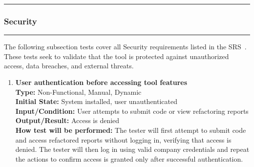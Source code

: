\documentclass[12pt, titlepage]{article}
\newcommand{\colorrule}{\textcolor{BlueViolet}{\rule{\linewidth}{2pt}}}
\begin{document}
\newpage

\noindent
\colorrule

\subsubsection{Security}
\colorrule

\medskip

\noindent
The following subsection tests cover all Security requirements listed in the SRS~\cite{SRS}. These tests seek to validate that the tool is protected against unauthorized access, data breaches, and external threats.

\begin{enumerate}[label={\bf \textcolor{Maroon}{test-SRT-\arabic*}}, wide=0pt, font=\itshape]
  \item \textbf{User authentication before accessing tool features} \\[2mm]
    \textbf{Type:} Non-Functional, Manual, Dynamic \\
    \textbf{Initial State:} System installed, user unauthenticated \\
    \textbf{Input/Condition:} User attempts to submit code or view refactoring reports \\
    \textbf{Output/Result:} Access is denied \\[2mm]
    \textbf{How test will be performed:} The tester will first attempt to submit code and access refactored reports without logging in, verifying that access is denied. The tester will then log in using valid company credentials and repeat the actions to confirm access is granted only after successful authentication.
  

\end{enumerate}
\end{document}
